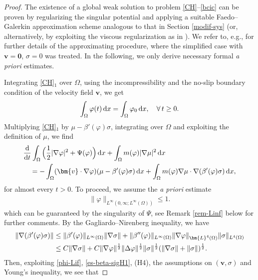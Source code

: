 \documentclass[11pt,reqno]{amsart}
\def\d{{\rm d}}
\def\ddt{\frac{\d}{\d t}}
\def\vv{\bm{v}}
\begin{document}
\begin{proof}
The existence of a global weak solution to problem \eqref{CH}--\eqref{bcic} can be proven by regularizing the singular potential and applying a suitable Faedo--Galerkin approximation scheme analogous to that in Section \ref{modif-sys} (or, alternatively, by exploiting the viscous regularization as in \cite{AGG2023}). We refer to, e.g.,  \cite[Lemma 2.4]{Sch07} for further details of the approximating procedure, where the simplified case with $\vv=\mathbf{0}$, $\sigma=0$ was treated. In the following, we only derive necessary formal {\it a priori} estimates.

Integrating \eqref{CH}$_1$ over $\Omega$, using the incompressibility and the no-slip boundary condition of the velocity field $\vv$, we get
%
\begin{equation}
\label{cons-mass}
\int_{\Omega} \varphi(t) \, \d x= \int_{\Omega} \varphi_{0} \, \d x, \quad \forall \, t \geq 0.
\end{equation}
%
Multiplying \eqref{CH}$_1$ by
$\mu - \beta'(\varphi) \sigma$, integrating over $\Omega$ and exploiting the definition of $\mu$, we find
\begin{align}
&
\ddt  \int_{\Omega} \Big( \frac12 |\nabla \varphi|^2 + \Psi(\varphi)\Big) \, \d x
+ \int_{\Omega}  m(\varphi) |\nabla \mu|^2\,\d x
\notag\\
&\quad = - \int_{\Omega} (\vv \cdot \nabla \varphi) (\mu-\beta'(\varphi) \sigma) \, \d x
+  \int_{\Omega} m(\varphi) \nabla \mu \cdot \nabla (\beta'(\varphi) \sigma)  \, \d x,
\label{CH-mu}
\end{align}
%
for almost every $t>0$. To proceed, we assume the {\it a priori} estimate
%
\begin{align}
\|\varphi\|_{L^\infty(0,\infty;L^\infty(\Omega))}\leq 1.
\label{phi-Lif}
\end{align}
%
which can be guaranteed by the singularity of $\Psi$, see Remark \ref{rem-Linf} below for further comments.
By the Gagliardo--Nirenberg inequality, we have
%
\begin{align}
\|\nabla (\beta'(\varphi) \sigma)\|
& \leq \|\beta'(\varphi)\|_{L^\infty(\Omega)}\|\nabla \sigma\|
+ \|\beta''(\varphi)\|_{L^\infty(\Omega)}\|\nabla \varphi\|_{\bm{L}^4(\Omega)}
\|\sigma\|_{L^4(\Omega)}
\notag\\
&\leq C\|\nabla \sigma\|+ C \|\nabla \varphi\|^\frac12
\|\Delta \varphi\|^\frac12
\|\sigma\|^\frac12(\|\nabla \sigma\|+\|\sigma\|)^\frac12.
\label{es-beta-sigH1}
\end{align}
%
Then, exploiting \eqref{phi-Lif}, \eqref{es-beta-sigH1}, (H4), the assumptions on $(\vv, \sigma)$ and  Young's inequality, we see that

\end{proof}
\end{document}
